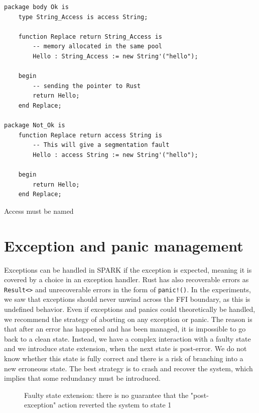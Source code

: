 \documentclass[nomenclature, english, bibtex]{kththesis}
\newcommand{\inlinecode}[1]{\texttt{#1}}
\begin{document}
\begin{listing}[!ht]
\begin{verbatim}
package body Ok is
    type String_Access is access String;
  
    function Replace return String_Access is
        -- memory allocated in the same pool
        Hello : String_Access := new String'("hello");

    begin
        -- sending the pointer to Rust
        return Hello;
    end Replace;

package Not_Ok is
    function Replace return access String is
        -- This will give a segmentation fault
        Hello : access String := new String'("hello");

    begin
        return Hello;
    end Replace;
\end{verbatim}
\caption[Access pool]{Access must be named}
\label{lst:samepool}
\end{listing}
\FloatBarrier


\section{Exception and panic management}



Exceptions can be handled in SPARK if the exception is expected, meaning it is covered by a choice in an exception handler. 
Rust has also recoverable errors as \inlinecode{Result<>} and unrecoverable errors in the form of \inlinecode{panic!()}. In the experiments, we saw that exceptions should never unwind across the FFI boundary, as this is undefined behavior. Even if exceptions and panics could theoretically be handled, we recommend the strategy of aborting on any exception or panic. The reason is that after an error has happened and has been managed, it is impossible to go back to a clean state. Instead, we have a complex interaction with a faulty state and we introduce state extension, when the next state is post-error. We do not know whether this state is fully correct and there is a risk of branching into a new erroneous state. The best strategy is to crash and recover the system, which implies that some redundancy must be introduced.

\begin{figure}[ht!]
  \centering 

\caption[Faulty state extension]{Faulty state extension: there is no guarantee that the "post-exception" action reverted the system to state 1}
\end{figure}
\FloatBarrier
\end{document}
